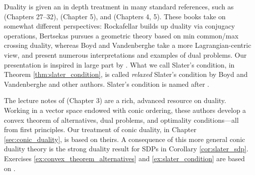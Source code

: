 Duality is given an in depth treatment in many standard references, such as
\cite{rockafellar1970convex} (Chapters 27--32), \cite{boyd2004convex} (Chapter  
5), and \cite{bertsekas2009convex} (Chapters 4, 5). These books take on
somewhat different perspectives: Rockafellar builds up duality via conjugacy
operations, Bertsekas pursues a geometric theory based on min common/max
crossing duality, whereas Boyd and Vandenberghe take a more Lagrangian-centric 
view, and present numerous interpretations and examples of dual problems. Our
presentation is inspired in large part by \cite{boyd2004convex}. What we call
Slater's condition, in Theorem \ref{thm:slater_condition}, is called
\emph{relaxed} Slater's condition by Boyd and Vandenberghe and other
authors. Slater's condition is named after \cite{slater1950lagrange}.  

The lecture notes of \cite{bental2023convex} (Chapter 3) are a rich, advanced
resource on duality. Working in a vector space endowed with conic ordering,
these authors develop a convex theorem of alternatives, dual problems, and
optimality conditions---all from first principles. Our treatment of conic 
duality, in Chapter \ref{sec:conic_duality}, is based on theirs. A consequence
of this more general conic duality theory is the strong duality result for SDPs
in Corollary \ref{cor:slater_sdp}. Exercises
\ref{ex:convex_theorem_alternatives} and \ref{ex:slater_condition} are based on
\cite{bental2023convex}.            
 
\clearpage

